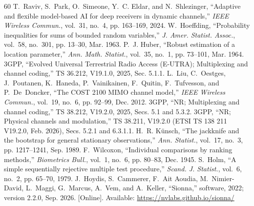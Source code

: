 \documentclass[journal]{IEEEtran}
\theoremstyle{remark}
\begin{document}
\begin{thebibliography}{60}
 T.~Raviv, S.~Park, O.~Simeone, Y.~C. Eldar, and N.~Shlezinger, ``Adaptive and flexible model-based AI for deep receivers in dynamic channels,'' \emph{IEEE Wireless Commun.}, vol.~31, no.~4, pp. 163--169, 2024.
 W.~Hoeffding, ``Probability inequalities for sums of bounded random variables,'' \emph{J. Amer. Statist. Assoc.}, vol.~58, no.~301, pp. 13--30, Mar. 1963.
 P.~J. Huber, ``Robust estimation of a location parameter,'' \emph{Ann. Math. Statist.}, vol.~35, no.~1, pp. 73--101, Mar. 1964.
 3GPP, ``Evolved Universal Terrestrial Radio Access (E-UTRA); Multiplexing and channel coding,'' TS 36.212, V19.1.0, 2025, Sec. 5.1.1.
 L.~Liu, C.~Oestges, J.~Poutanen, K.~Haneda, P.~Vainikainen, F.~Quitin, F.~Tufvesson, and P.~De~Doncker, ``The COST 2100 MIMO channel model,'' \emph{IEEE Wireless Commun.}, vol.~19, no.~6, pp. 92--99, Dec. 2012.
 3GPP, ``NR; Multiplexing and channel coding,'' TS 38.212, V19.2.0, 2025, Secs. 5.1 and 5.3.2.
 3GPP, ``NR; Physical channels and modulation,'' TS 38.211, V19.2.0 (ETSI TS 138 211 V19.2.0, Feb. 2026), Secs. 5.2.1 and 6.3.1.1.
 H.~R. K{\"u}nsch, ``The jackknife and the bootstrap for general stationary observations,'' \emph{Ann. Statist.}, vol.~17, no.~3, pp. 1217--1241, Sep. 1989.
 F.~Wilcoxon, ``Individual comparisons by ranking methods,'' \emph{Biometrics Bull.}, vol.~1, no.~6, pp. 80--83, Dec. 1945.
 S.~Holm, ``A simple sequentially rejective multiple test procedure,'' \emph{Scand. J. Statist.}, vol.~6, no.~2, pp. 65--70, 1979.
 J.~Hoydis, S.~Cammerer, F.~Ait Aoudia, M.~Nimier-David, L.~Maggi, G.~Marcus, A.~Vem, and A.~Keller, ``Sionna,'' software, 2022; version 2.2.0, Sep. 2026. [Online]. Available: \url{https://nvlabs.github.io/sionna/}
\end{thebibliography}
\end{document}
